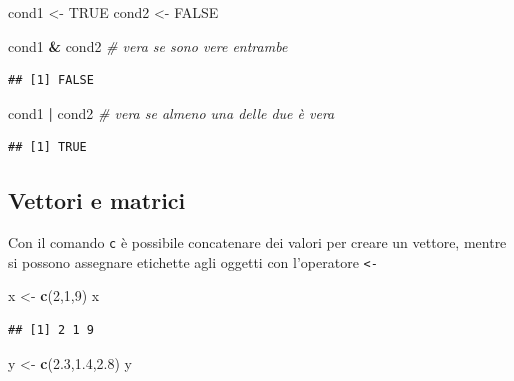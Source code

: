 \documentclass[
  11pt,
]{book}
\newenvironment{Shaded}{\begin{snugshade}}{\end{snugshade}}
\newcommand{\CommentTok}[1]{\textcolor[rgb]{0.56,0.35,0.01}{\textit{#1}}}
\newcommand{\ConstantTok}[1]{\textcolor[rgb]{0.56,0.35,0.01}{#1}}
\newcommand{\DecValTok}[1]{\textcolor[rgb]{0.00,0.00,0.81}{#1}}
\newcommand{\FloatTok}[1]{\textcolor[rgb]{0.00,0.00,0.81}{#1}}
\newcommand{\FunctionTok}[1]{\textcolor[rgb]{0.13,0.29,0.53}{\textbf{#1}}}
\newcommand{\NormalTok}[1]{#1}
\newcommand{\OtherTok}[1]{\textcolor[rgb]{0.56,0.35,0.01}{#1}}
\newcommand{\SpecialCharTok}[1]{\textcolor[rgb]{0.81,0.36,0.00}{\textbf{#1}}}
\theoremstyle{mytheoremstyle}
\theoremstyle{mydefstyle}
\begin{document}
\begin{Shaded}
\begin{Highlighting}[]
\NormalTok{cond1 }\OtherTok{\textless{}{-}} \ConstantTok{TRUE}
\NormalTok{cond2 }\OtherTok{\textless{}{-}} \ConstantTok{FALSE}

\NormalTok{cond1 }\SpecialCharTok{\&}\NormalTok{ cond2 }\CommentTok{\# vera se sono vere entrambe}
\end{Highlighting}
\end{Shaded}

\begin{verbatim}
## [1] FALSE
\end{verbatim}

\begin{Shaded}
\begin{Highlighting}[]
\NormalTok{cond1 }\SpecialCharTok{|}\NormalTok{ cond2 }\CommentTok{\# vera se almeno una delle due è vera}
\end{Highlighting}
\end{Shaded}

\begin{verbatim}
## [1] TRUE
\end{verbatim}

\subsection{Vettori e matrici}\label{vettori-e-matrici}

Con il comando \texttt{c} è possibile concatenare dei valori per creare un vettore, mentre
si possono assegnare etichette agli oggetti con l'operatore \texttt{\textless{}-}

\begin{Shaded}
\begin{Highlighting}[]
\NormalTok{x }\OtherTok{\textless{}{-}} \FunctionTok{c}\NormalTok{(}\DecValTok{2}\NormalTok{,}\DecValTok{1}\NormalTok{,}\DecValTok{9}\NormalTok{)}
\NormalTok{x}
\end{Highlighting}
\end{Shaded}

\begin{verbatim}
## [1] 2 1 9
\end{verbatim}

\begin{Shaded}
\begin{Highlighting}[]
\NormalTok{y }\OtherTok{\textless{}{-}} \FunctionTok{c}\NormalTok{(}\FloatTok{2.3}\NormalTok{,}\FloatTok{1.4}\NormalTok{,}\FloatTok{2.8}\NormalTok{)}
\NormalTok{y}
\end{Highlighting}
\end{Shaded}
\end{document}
